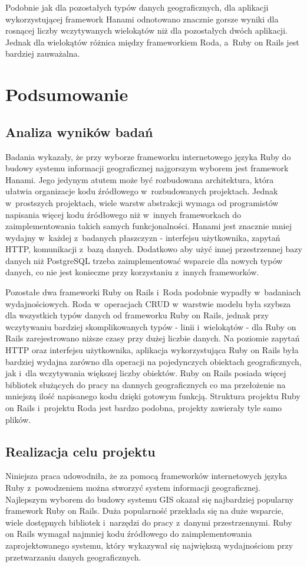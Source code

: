 \documentclass[printmode]{mgr}
\begin{document}
Podobnie jak dla pozostałych typów danych geograficznych, dla aplikacji wykorzystującej framework Hanami odnotowano znacznie gorsze wyniki dla rosnącej liczby wczytywanych wielokątów niż dla pozostałych dwóch aplikacji. Jednak dla wielokątów różnica między frameworkiem Roda, a~Ruby on Rails jest bardziej zauważalna.

\chapter{Podsumowanie}
\section{Analiza wyników badań}

Badania wykazały, że przy wyborze frameworku internetowego języka Ruby do budowy systemu informacji geograficznej najgorszym wyborem jest framework Hanami. Jego jedynym atutem może być rozbudowana architektura, która ułatwia organizacje kodu źródłowego w~rozbudowanych projektach. Jednak w~prostszych projektach, wiele warstw abstrakcji wymaga od programistów napisania więcej kodu źródłowego niż w~innych frameworkach do zaimplementowania takich samych funkcjonalności. Hanami jest znacznie mniej wydajny w~każdej z~badanych płaszczyzn - interfejsu użytkownika, zapytań HTTP, komunikacji z~bazą danych. Dodatkowo aby użyć innej przestrzennej bazy danych niż PostgreSQL trzeba zaimplementować wsparcie dla nowych typów danych, co nie jest konieczne przy korzystaniu z~innych frameworków.

Pozostałe dwa frameworki Ruby on Rails i~Roda podobnie wypadły w~badaniach wydajnościowych. Roda w~operacjach CRUD w~warstwie modelu była szybsza dla wszystkich typów danych od frameworku Ruby on Rails, jednak przy wczytywaniu bardziej skomplikowanych typów - linii i~wielokątów - dla Ruby on Rails zarejestrowano niższe czasy przy dużej liczbie danych. Na poziomie zapytań HTTP oraz interfejsu użytkownika, aplikacja wykorzystująca Ruby on Rails była bardziej wydajna zarówno dla  operacji na pojedynczych obiektach geograficznych, jak i~dla wczytywania większej liczby obiektów. Ruby on Rails posiada więcej bibliotek służących do pracy na dannych geograficznych co ma przełożenie na mniejszą ilość napisanego kodu dzięki gotowym funkcją. Struktura projektu Ruby on Rails i~projektu Roda jest bardzo podobna, projekty zawierały tyle samo plików.

\section{Realizacja celu projektu}
Niniejsza praca udowodniła, że za pomocą frameworków internetowych języka Ruby z~powodzeniem można stworzyć system informacji geograficznej. Najlepszym wyborem do budowy systemu GIS okazał się najbardziej popularny framework Ruby on Rails. Duża popularność przekłada się na duże wsparcie, wiele dostępnych bibliotek i~narzędzi do pracy z~danymi przestrzennymi. Ruby on Rails wymagał najmniej kodu źródłowego do zaimplementowania zaprojektowanego systemu, który wykazywał się największą wydajnościom przy przetwarzaniu danych geograficznych.
  
\end{document}

